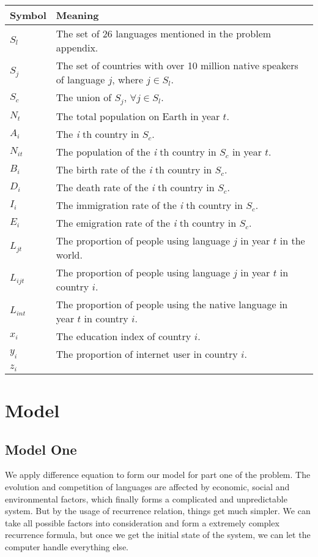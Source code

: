 \documentclass{mcmthesis}
\begin{document}
\begin{tabularx}{\textwidth}{l|X}
\hline
  \textbf{Symbol} & \textbf{Meaning} \\
\hline
    $S_l$ & The set of 26 languages mentioned in the problem appendix.\\ \hline
    $S_j$ & The set of countries with over 10 million native speakers of language $j$, where $j \in S_l$.\\ \hline
    $S_c$ & The union of $S_j$, $\forall j \in S_l$.\\ \hline
    $N_t$ & The total population on Earth in year $t$.\\ \hline
    $A_i$ & The \textit{i} th country in $S_c$.\\ \hline
    $N_{it}$ & The population of the \textit{i} th country in $S_c$ in year $t$.\\ \hline
    $B_i$ & The birth rate of the \textit{i} th country in $S_c$.\\ \hline
    $D_i$ & The death rate of the \textit{i} th country in $S_c$.\\ \hline
    $I_i$ & The immigration rate of the \textit{i} th country in $S_c$.\\ \hline
    $E_i$ & The emigration rate of the \textit{i} th country in $S_c$.\\ \hline
    $L_{jt}$ & The proportion of people using language $j$ in year $t$ in the world.\\ \hline
    $L_{ijt}$ & The proportion of people using language $j$ in year $t$ in country $i$.\\ \hline
    $L_{int}$ & The proportion of people using the native language in year $t$ in country $i$.\\ \hline
    $x_i$ & The education index of country $i$.\\ \hline
    $y_i$ & The proportion of internet user in country $i$.\\ \hline
    $z_i$ & \\ \hline

\end{tabularx}


\section{Model}
\subsection{Model One}
We apply difference equation to form our model for part one of the problem. The evolution and competition of languages are affected by economic, social and environmental factors, which finally forms a complicated and unpredictable system. But by the usage of recurrence relation, things get much simpler. We can take all possible factors into consideration and form a extremely complex recurrence formula, but once we get the initial state of the system, we can let the computer handle everything else.
\end{document}
